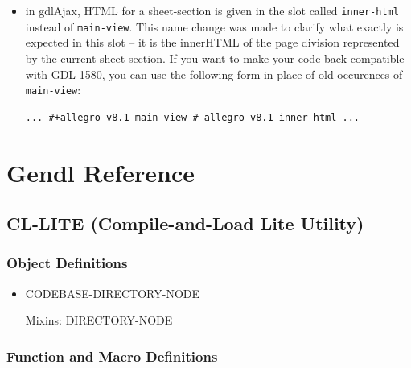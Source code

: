 \documentclass [11pt]{book}
\begin{document}
\begin{itemize}
\item in gdlAjax, HTML for a sheet-section is given in the slot called \texttt{inner-html} instead of \texttt{main-view}. This name change was made to clarify what exactly is
	 expected in this slot -- it is the innerHTML of the page
	 division represented by the current sheet-section. If you
	 want to make your code back-compatible with GDL 1580, you can
	 use the following form in place of old occurences of \texttt{main-view}: 

\begin{verbatim}... #+allegro-v8.1 main-view #-allegro-v8.1 inner-html ...
\end{verbatim}

\end{itemize}



\chapter{Gendl Reference}

\label{chap:gendlreference}



\section{CL-LITE (Compile-and-Load Lite Utility)}

\label{sec:cl-lite(compile-and-loadliteutility)}





\subsection{Object Definitions}

\label{subsec:objectdefinitions}



\begin{itemize}

\item {}CODEBASE-DIRECTORY-NODE

Mixins: DIRECTORY-NODE



\end{itemize}



\subsection{Function and Macro Definitions}
\end{document}
